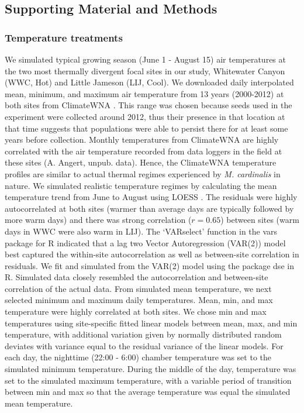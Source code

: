 \documentclass[11pt, oneside]{article}
\newcommand{\pkg}[1]{{\fontseries{b}\selectfont #1}}
\begin{document}
\clearpage

\subsection*{Supporting Material and Methods}

\subsubsection*{Temperature treatments}

We simulated typical growing season (June 1 - August 15) air temperatures at the two most thermally divergent focal sites in our study, Whitewater Canyon (WWC, Hot) and Little Jameson (LIJ, Cool). We downloaded daily interpolated mean, minimum, and maximum air temperature from 13 years (2000-2012) at both sites from ClimateWNA \citep{Wang_etal_2012}. This range was chosen because seeds used in the experiment were collected around 2012, thus their presence in that location at that time suggests that populations were able to persist there for at least some years before collection. Monthly temperatures from ClimateWNA are highly correlated with the air temperature recorded from data loggers in the field at these sites (A. Angert, unpub. data). Hence, the ClimateWNA temperature profiles are similar to actual thermal regimes experienced by \textit{M. cardinalis} in nature. We simulated realistic temperature regimes by calculating the mean temperature trend from June to August using LOESS \citep{Cleveland_etal_1992}. The residuals were highly autocorrelated at both sites (warmer than average days are typically followed by more warm days) and there was strong correlation ($r = 0.65$) between sites (warm days in WWC were also warm in LIJ). The `VARselect' function in the \pkg{vars} package for R \citep{Pfaff_2008} indicated that a lag two Vector Autoregression (VAR(2)) model best captured the within-site autocorrelation as well as between-site correlation in residuals. We fit and simulated from the VAR(2) model using the package \pkg{dse} \citep{Gilbert_2014} in R. Simulated data closely resembled the autocorrelation and between-site correlation of the actual data. From simulated mean temperature, we next selected minimum and maximum daily temperatures. Mean, min, and max temperature were highly correlated at both sites. We chose min and max temperatures using site-specific fitted linear models between mean, max, and min temperature, with additional variation given by normally distributed random deviates with variance equal to the residual variance of the linear models. For each day, the nighttime (22:00 - 6:00) chamber temperature was set to the simulated minimum temperature. During the middle of the day, temperature was set to the simulated maximum temperature, with a variable period of transition between min and max so that the average temperature was equal the simulated mean temperature.
\end{document}
